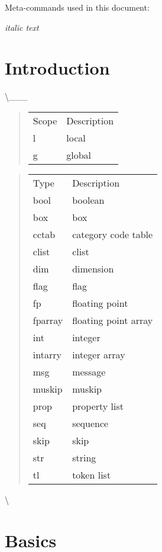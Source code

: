 \documentclass{article}
\newcounter{ic_eg_count}[section]
\newcommand\theadrcol{\rowcolor{blue!80}}
\newcommand\theadcellstyle{\color{white}\sffamily}
\newcommand\tablea[2]{%
\begin{quotation}
\begin{tabular}{ll}
\theadrcol
\theadcellstyle #1 & \theadcellstyle #2 \\
}
\newcommand\tableb{%
\hline
\end{tabular}
\end{quotation}
}
\begin{document}
Meta-commands used in this document:

\begin{LTXexample}[numbers=left]
\textit{italic text}\par
{}\par
   \par
{}\par
{}\par
   \par
{}\par
{}\par
\end{LTXexample}

\section{Introduction}


\textbackslash{}\_\_\_

\tablea{Scope}{Description}
l & local \\
g & global \\
\tableb

\tablea{Type}{Description}
bool & boolean \\
box & box \\
cctab & category code table \\
clist & clist \\
dim & dimension \\
flag & flag \\
fp & floating point \\
fparray & floating point array \\
int & integer \\
intarry & integer array \\
msg & message \\
muskip & muskip \\
prop & property list \\
seq & sequence \\
skip & skip \\
str & string \\
tl & token list \\
\tableb



\textbackslash{}

\section{Basics}
\end{document}
